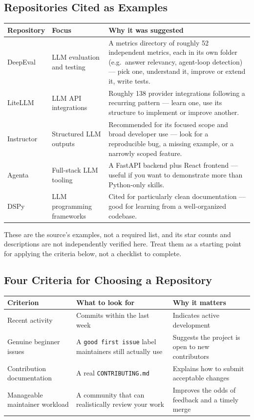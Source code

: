 \subsection{Repositories Cited as Examples}

\begin{longtable}{p{} p{} p{}}
\toprule
\textbf{Repository} & \textbf{Focus} & \textbf{Why it was suggested} \\
\midrule
\endhead
DeepEval & LLM evaluation and testing & A metrics directory of roughly 52 independent metrics, each in its own
folder (e.g.\ answer relevancy, agent-loop detection) --- pick one, understand it, improve or extend it, write
tests. \\
LiteLLM & LLM API integrations & Roughly 138 provider integrations following a recurring pattern --- learn one,
use its structure to implement or improve another. \\
Instructor & Structured LLM outputs & Recommended for its focused scope and broad developer use --- look for a
reproducible bug, a missing example, or a narrowly scoped feature. \\
Agenta & Full-stack LLM tooling & A FastAPI backend plus React frontend --- useful if you want to demonstrate
more than Python-only skills. \\
DSPy & LLM programming frameworks & Cited for particularly clean documentation --- good for learning from a
well-organized codebase. \\
\bottomrule
\end{longtable}

\begin{caution}
These are the source's examples, not a required list, and its star counts and descriptions are not independently
verified here. Treat them as a starting point for applying the criteria below, not a checklist to complete.
\end{caution}

\subsection{Four Criteria for Choosing a Repository}

\begin{longtable}{p{} p{} p{}}
\toprule
\textbf{Criterion} & \textbf{What to look for} & \textbf{Why it matters} \\
\midrule
\endhead
Recent activity & Commits within the last week & Indicates active development \\
Genuine beginner issues & A \texttt{good first issue} label maintainers still actually use & Suggests the
project is open to new contributors \\
Contribution documentation & A real \texttt{CONTRIBUTING.md} & Explains how to submit acceptable changes \\
Manageable maintainer workload & A community that can realistically review your work & Improves the odds of
feedback and a timely merge \\
\bottomrule
\end{longtable}

